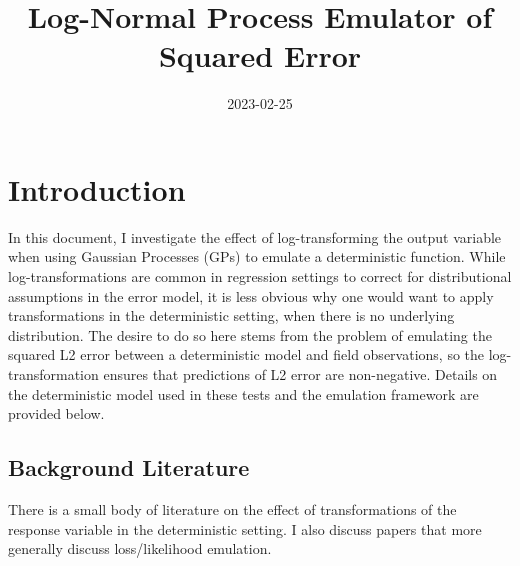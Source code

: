 \documentclass[
]{article}
\title{Log-Normal Process Emulator of Squared Error}
\author{}
\date{\vspace{-2.5em}2023-02-25}
\begin{document}
\maketitle

\hypertarget{introduction}{%
\section{Introduction}\label{introduction}}

In this document, I investigate the effect of log-transforming the
output variable when using Gaussian Processes (GPs) to emulate a
deterministic function. While log-transformations are common in
regression settings to correct for distributional assumptions in the
error model, it is less obvious why one would want to apply
transformations in the deterministic setting, when there is no
underlying distribution. The desire to do so here stems from the problem
of emulating the squared L2 error between a deterministic model and
field observations, so the log-transformation ensures that predictions
of L2 error are non-negative. Details on the deterministic model used in
these tests and the emulation framework are provided below.

\hypertarget{background-literature}{%
\subsection{Background Literature}\label{background-literature}}

There is a small body of literature on the effect of transformations of
the response variable in the deterministic setting. I also discuss
papers that more generally discuss loss/likelihood emulation.
\end{document}
